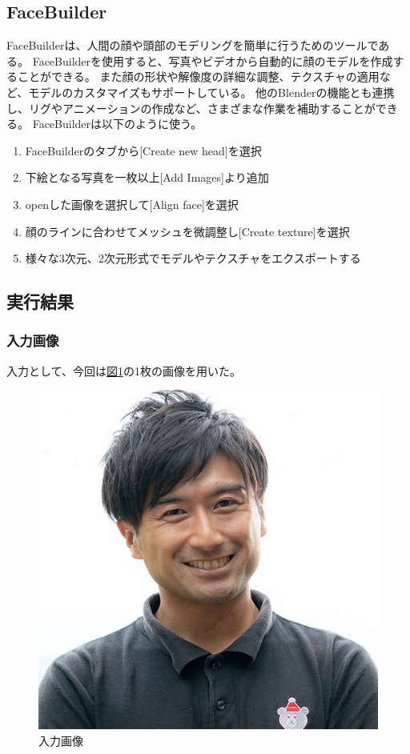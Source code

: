 \documentclass[]{jarticle}          %
\begin{document}
\subsection{FaceBuilder}
FaceBuilderは、人間の顔や頭部のモデリングを簡単に行うためのツールである。
FaceBuilderを使用すると、写真やビデオから自動的に顔のモデルを作成することができる。
また顔の形状や解像度の詳細な調整、テクスチャの適用など、モデルのカスタマイズもサポートしている。
他のBlenderの機能とも連携し、リグやアニメーションの作成など、さまざまな作業を補助することができる。
FaceBuilderは以下のように使う。
\begin{enumerate}
  \item FaceBuilderのタブから[Create new head]を選択
  \item 下絵となる写真を一枚以上[Add Images]より追加
  \item openした画像を選択して[Align face]を選択
  \item 顔のラインに合わせてメッシュを微調整し[Create texture]を選択
  \item 様々な3次元、2次元形式でモデルやテクスチャをエクスポートする
\end{enumerate}

\subsection{実行結果}
\subsubsection{入力画像}
入力として、今回は\hyperref[one]{図\ref{one}}の1枚の画像を用いた。
\begin{figure}[!ht]
  \begin{center}
    \includegraphics[scale=0.3]{figures/man1.jpg}
    \caption{入力画像}
    \label{one}
  \end{center}
\end{figure}
\end{document}
